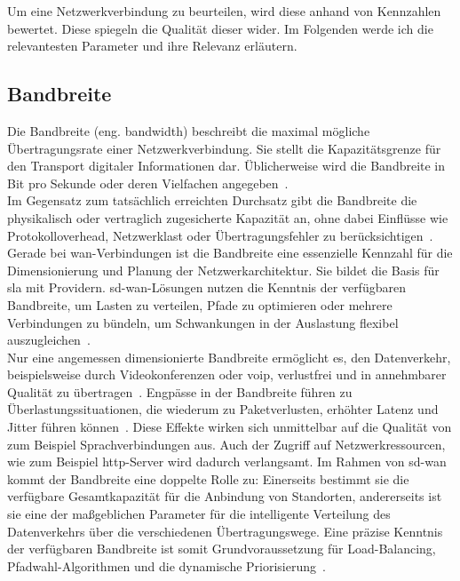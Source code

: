 
Um eine Netzwerkverbindung zu beurteilen, wird diese anhand von Kennzahlen bewertet. Diese spiegeln die Qualität dieser wider. Im Folgenden werde ich die relevantesten Parameter und ihre Relevanz erläutern.\\

\subsection*{Bandbreite}
Die Bandbreite (eng. bandwidth) beschreibt die maximal mögliche Übertragungsrate einer Netzwerkverbindung. Sie stellt die Kapazitätsgrenze für den Transport digitaler Informationen dar. Üblicherweise wird die Bandbreite in Bit pro Sekunde oder deren Vielfachen angegeben~\cite[9]{forouzanDataCommunicationsNetworking2012}.\\
Im Gegensatz zum tatsächlich erreichten Durchsatz gibt die Bandbreite die physikalisch oder vertraglich zugesicherte Kapazität an, ohne dabei Einflüsse wie Protokolloverhead, Netzwerklast oder Übertragungsfehler zu berücksichtigen~\cite{tanenbaumComputernetzwerke2012}. Gerade bei \ac{wan}-Verbindungen ist die Bandbreite eine essenzielle Kennzahl für die Dimensionierung und Planung der Netzwerkarchitektur. Sie bildet die Basis für \acl{sla} mit Providern. \ac{sd-wan}-Lösungen nutzen die Kenntnis der verfügbaren Bandbreite, um Lasten zu verteilen, Pfade zu optimieren oder mehrere Verbindungen zu bündeln, um Schwankungen in der Auslastung flexibel auszugleichen~\cite{segecSDWANArchitectureFunctions2020}.\\
Nur eine angemessen dimensionierte Bandbreite ermöglicht es, den Datenverkehr, beispielsweise durch Videokonferenzen oder \ac{voip}, verlustfrei und in annehmbarer Qualität zu übertragen~\cite{forouzanDataCommunicationsNetworking2012}. Engpässe in der Bandbreite führen zu Überlastungssituationen, die wiederum zu Paketverlusten, erhöhter Latenz und Jitter führen können~\cite{tanenbaumComputernetzwerke2012}. Diese Effekte wirken sich unmittelbar auf die Qualität von zum Beispiel Sprachverbindungen aus. Auch der Zugriff auf Netzwerkressourcen, wie zum Beispiel \ac{http}-Server wird dadurch verlangsamt. Im Rahmen von \ac{sd-wan} kommt der Bandbreite eine doppelte Rolle zu: Einerseits bestimmt sie die verfügbare Gesamtkapazität für die Anbindung von Standorten, andererseits ist sie eine der maßgeblichen Parameter für die intelligente Verteilung des Datenverkehrs über die verschiedenen Übertragungswege. Eine präzise Kenntnis der verfügbaren Bandbreite ist somit Grundvoraussetzung für Load-Balancing, Pfadwahl-Algorithmen und die dynamische Priorisierung~\cite{kuroseComputernetzwerkeTopDownAnsatz2014}.

